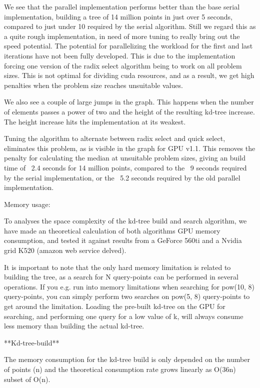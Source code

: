 We see that the parallel implementation performs better than the base serial implementation, building a tree of 14 million points in just over 5 seconds, compared to just under 10 required by the serial algorithm. Still we regard this as a quite rough implementation, in need of more tuning to really bring out the speed potential. The potential for parallelizing the workload for the first and last iterations have not been fully developed. This is due to the implementation forcing one version of the radix select algorithm being to work on all problem sizes. This is not optimal for dividing cuda resources, and as a result, we get high penalties when the problem size reaches unsuitable values.

We also see a couple of large jumps in the graph. This happens when the number of elements passes a power of two and the height of the resulting kd-tree increase. The height increase hits the implementation at its weakest.

Tuning the algorithm to alternate between radix select and quick select, eliminates this problem, as is visible in the graph for GPU v1.1. This removes the penalty for calculating the median at unsuitable problem sizes, giving an build time of ~2.4 seconds for 14 million points, compared to the ~9 seconds required by the serial implementation, or the ~5.2 seconds required by the old parallel implementation.

Memory usage:

To analyses the space complexity of the kd-tree build and search algorithm, we have made an theoretical calculation of both algorithms GPU memory consumption, and tested it against results from a GeForce 560ti and a Nvidia grid K520 (amazon web service delved).

It is important to note that the only hard memory limitation is related to building the tree, as a search for N query-points can be performed in several operations. If you e.g. run into memory limitations when searching for pow(10, 8) query-points, you can simply perform two searches on pow(5, 8) query-points to get around the limitation. Loading the pre-built kd-tree on the GPU for searching, and performing one query for a low value of k, will always consume less memory than building the actual kd-tree.

**Kd-tree-build**

The memory consumption for the kd-tree build is only depended on the number of points (n) and the theoretical consumption rate grows linearly as O(36n) subset of O(n).

